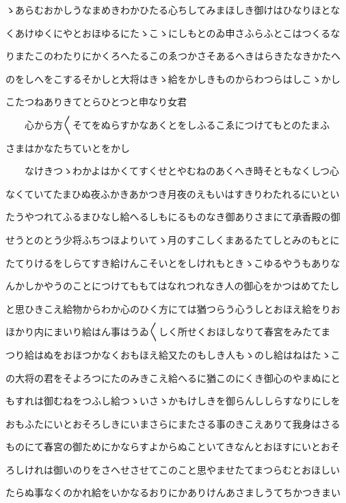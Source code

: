 \documentclass[a4paper,11pt,landscape]{ltjtarticle}
\begin{document}
\par\medskip
ゝあらむおかしうなまめきわかひたる心ちしてみまほしき御けはひなりほとな
\par\medskip
くあけゆくにやとおほゆるにたゝこゝにしもとのゐ申さふらふとこはつくるな
\par\medskip
りまたこのわたりにかくろへたるこのゑつかさそあるへきはらきたなきかたへ
\par\medskip
のをしへをこするそかしと大将はきゝ給をかしきものからわつらはしこゝかし
\par\medskip
こたつねありきてとらひとつと申なり女君
\par\medskip
　　心から方〱そてをぬらすかなあくとをしふるこゑにつけてもとのたまふ
\par\medskip
さまはかなたちていとをかし
\par\medskip
　　なけきつゝわかよはかくてすくせとやむねのあくへき時そともなくしつ心
\par\medskip
なくていてたまひぬ夜ふかきあかつき月夜のえもいはすきりわたれるにいとい
\par\medskip
たうやつれてふるまひなし給へるしもにるものなき御ありさまにて承香殿の御
\par\medskip
せうとのとう少将ふちつほよりいてゝ月のすこしくまあるたてしとみのもとに
\par\medskip
たてりけるをしらてすき給けんこそいとをしけれもときゝこゆるやうもありな
\par\medskip
んかしかやうのことにつけてももてはなれつれなき人の御心をかつはめてたし
\par\medskip
と思ひきこえ給物からわか心のひく方にては猶つらう心うしとおほえ給をりお
\par\medskip
ほかり内にまいり給はん事はうゐ〱しく所せくおほしなりて春宮をみたてま
\par\medskip
つり給はぬをおほつかなくおもほえ給又たのもしき人もゝのし給はねはたゝこ
\par\medskip
の大将の君をそよろつにたのみきこえ給へるに猶このにくき御心のやまぬにと
\par\medskip
もすれは御むねをつふし給つゝいさゝかもけしきを御らんししらすなりにしを
\par\medskip
おもふたにいとおそろしきにいまさらにまたさる事のきこえありて我身はさる
\par\medskip
ものにて春宮の御ためにかならすよからぬこといてきなんとおほすにいとおそ
\par\medskip
ろしけれは御いのりをさへせさせてこのこと思やませたてまつらむとおほしい
\par\medskip
たらぬ事なくのかれ給をいかなるおりにかありけんあさましうてちかつきまい
\end{document}

